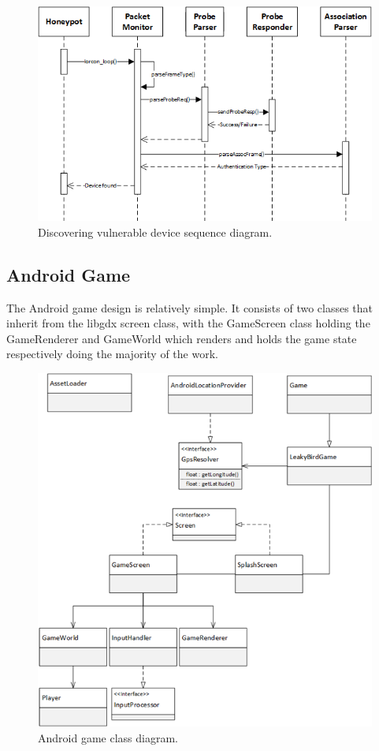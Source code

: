 \begin{figure}[h!]
\centering\includegraphics[width=\linewidth]{design/figures/discover-device-seq.png}
\caption{Discovering vulnerable device sequence diagram.}
\label{fig:discover_device_seq}
\end{figure}
\clearpage
\subsection{Android Game}
The Android game design is relatively simple. It consists of two classes that inherit from the libgdx screen class, with the GameScreen class holding the GameRenderer and GameWorld which renders and holds the game state respectively doing the majority of the work.

\begin{figure}[h!]
\centering\includegraphics[width=\linewidth]{design/figures/ag-cd.png}
\caption{Android game class diagram.}
\end{figure}
\clearpage
